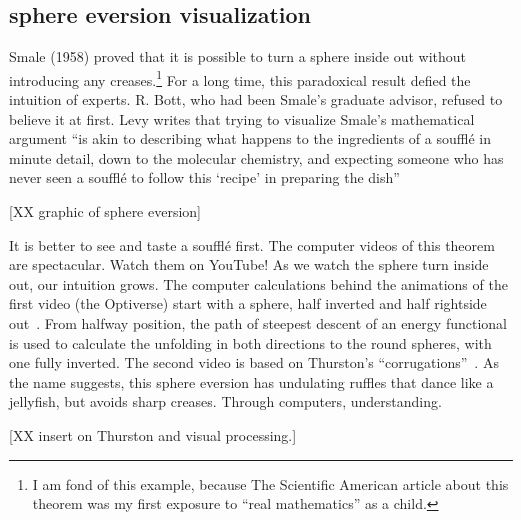 \documentclass{llncs}
\begin{document}
\subsection{sphere eversion visualization}







Smale (1958) proved that it is possible to turn a sphere inside out
without introducing any creases.\footnote{I am fond of this example,
because The Scientific American
  article \cite{Phi66} about this theorem was my first exposure to ``real
  mathematics'' as a child.}  For a long time, this paradoxical result
defied the intuition of experts.  R. Bott, who had been Smale's
graduate advisor, refused to believe it at first.  Levy writes that
trying to visualize Smale's mathematical argument ``is akin to
describing what happens to the ingredients of a souffl\'e in minute
detail, down to the molecular chemistry, and expecting someone who has
never seen a souffl\'e to follow this `recipe' in preparing the
dish''~\cite{Le95}

[XX graphic of sphere eversion]

It is better to see and taste a souffl\'e first.  The computer videos
of this theorem are spectacular.  Watch them on YouTube!  As we watch
the sphere turn inside out, our intuition grows.  The computer
calculations behind the animations of the first video (the Optiverse)
start with a sphere, half inverted and half rightside out~\cite{SFL}.  From
halfway position, the path of steepest descent of an energy functional is
used to calculate the unfolding in both directions to the round spheres,
with one fully inverted.  The second video is based on Thurston's
``corrugations''~\cite{LMM}. As the name suggests, this sphere eversion has
undulating ruffles that dance like a jellyfish, but avoids sharp
creases.   Through computers, understanding.

[XX insert on Thurston and visual processing.]
\end{document}
